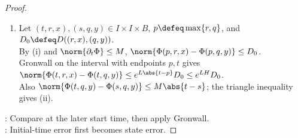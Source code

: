 \begin{theorem}
\begin{proof}
\begin{enumerate}[label=(\roman*)]
Set $\Phi(t,r,x)\defeq u_{r,x}(t)$; then $\Phi(r,r,x)=x$, $(t,\Phi(t,r,x))\in V$, and $\partial_t\Phi(t,r,x)=f(t,\Phi(t,r,x))$.
\item Let $(t,r,x),(s,q,y)\in I\times I\times B$, $p\defeq\max\{r,q\}$, and $D_0\defeq D((r,x),(q,y))$.\\
By (i) and $\norm{\partial_t\Phi}\leq M$, $\norm{\Phi(p,r,x)-\Phi(p,q,y)}\leq D_0$.\\
Gronwall on the interval with endpoints $p,t$ gives $\norm{\Phi(t,r,x)-\Phi(t,q,y)}\leq e^{L\abs{t-p}}D_0\leq e^{LH}D_0$.\\
Also $\norm{\Phi(t,q,y)-\Phi(s,q,y)}\leq M\abs{t-s}$; the triangle inequality gives (ii).
\end{enumerate}
: Compare at the later start time, then apply Gronwall.\\
: Initial-time error first becomes state error.
\end{proof}
\end{theorem}

